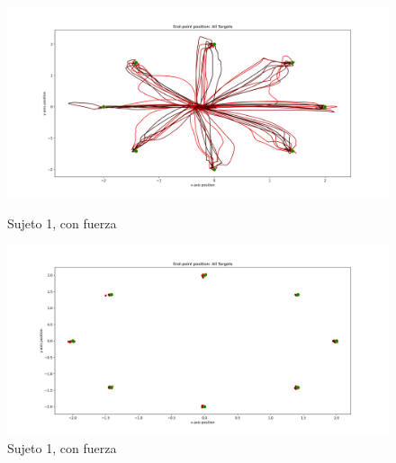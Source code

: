 \documentclass[a4paper,11pt, oneside]{book}
\begin{document}
\begin{figure}[H]
	\begin{minipage}[b]{0.5\linewidth}
		\centering
		\includegraphics[width=\linewidth]{sujeto1/force/trayectorias}
		\caption{Sujeto 1, con fuerza}
		\label{fig:figura1}
	\end{minipage}
	\hspace{0.5cm}
	\begin{minipage}[b]{0.5\linewidth}
		\centering
		\includegraphics[width=\linewidth]{sujeto1/force/trayectorias_puntos}
		\caption{Sujeto 1, con fuerza}
		\label{fig:figura2}
	\end{minipage}
\end{figure}
\end{document}
